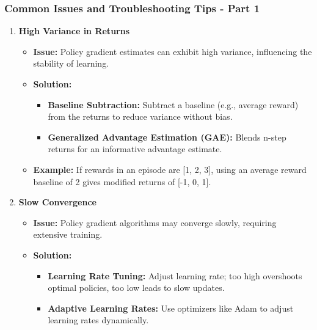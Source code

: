\documentclass[aspectratio=169]{beamer}
\begin{document}
\begin{frame}[fragile]
    \frametitle{Common Issues and Troubleshooting Tips - Part 1}
    \begin{enumerate}
        \item \textbf{High Variance in Returns}
          \begin{itemize}
            \item \textbf{Issue:} Policy gradient estimates can exhibit high variance, influencing the stability of learning.
            \item \textbf{Solution:}
              \begin{itemize}
                  \item \textbf{Baseline Subtraction:} Subtract a baseline (e.g., average reward) from the returns to reduce variance without bias.
                  \item \textbf{Generalized Advantage Estimation (GAE):} Blends n-step returns for an informative advantage estimate.
              \end{itemize}
            \item \textbf{Example:} If rewards in an episode are [1, 2, 3], using an average reward baseline of 2 gives modified returns of [-1, 0, 1].
          \end{itemize}
          
        \item \textbf{Slow Convergence}
          \begin{itemize}
            \item \textbf{Issue:} Policy gradient algorithms may converge slowly, requiring extensive training.
            \item \textbf{Solution:}
              \begin{itemize}
                  \item \textbf{Learning Rate Tuning:} Adjust learning rate; too high overshoots optimal policies, too low leads to slow updates.
                  \item \textbf{Adaptive Learning Rates:} Use optimizers like Adam to adjust learning rates dynamically.
              \end{itemize}
          \end{itemize}
    \end{enumerate}
\end{frame}
\end{document}
